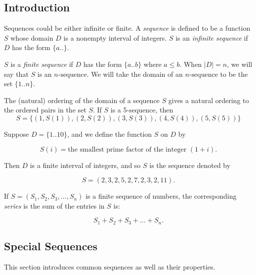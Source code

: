 \subsection{Introduction}
Sequences could be either infinite or finite. A \textit{sequence} is defined to be a function \( S \) whose domain \( D \) is a nonempty interval of integers. \( S \) is an \textit{infinite sequence} if \( D \) has the form \( \{a..\} \). %

\( S \) is a \textit{finite sequence} if \( D \) has the form \( \{a..b\} \) where \( a \leq b \). When \( |D| = n \), we will say that \( S \) is an \( n\text{-sequence} \). We will take the domain of an \( n\text{-sequence} \) to be the set \( \{1..n\} \). %

The (natural) ordering of the domain of a sequence \( S \) gives a natural ordering to the ordered pairs in the set \( S \). If \( S \) is a 5-sequence, then
\[ S = \{(1, S(1)), (2, S(2)), (3, S(3)), (4, S(4)), (5, S(5))\} \]

\begin{example}
    Suppose \( D = \{1..10\} \), and we define the function \( S \) on \( D \) by

\[ S(i) = \text{the smallest prime factor of the integer } (1 + i). \]

Then \( D \) is a finite interval of integers, and so \( S \) is the sequence denoted by

\[ S = (2, 3, 2, 5, 2, 7, 2, 3, 2, 11). \]
\end{example}

\begin{definition}
    If \( S = (S_1, S_2, S_3, \ldots, S_n) \) is a finite sequence of numbers, the corresponding \textit{series} is the sum of the entries in \( S \)
    is:

\[ S_1 + S_2 + S_3 + \ldots + S_n. \]
\end{definition}
\subsection{Special Sequences}
This section introduces common sequences as well as their properties.
